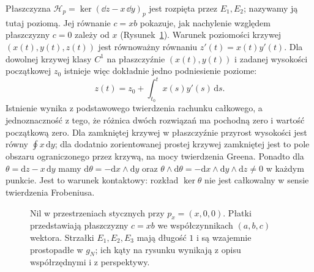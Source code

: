 Płaszczyzna $\mathcal H_p=\ker(\dd z-x\,\dd y)_p$
jest rozpięta przez $E_1,E_2$; nazywamy ją tutaj poziomą.
Jej równanie $c=xb$ pokazuje, jak nachylenie
względem płaszczyzny $c=0$ zależy od $x$
(Rysunek~\ref{fig:metryka-nil-plaszczyzny}).
Warunek poziomości krzywej $(x(t),y(t),z(t))$
jest równoważny równaniu $z'(t)=x(t)y'(t)$.
Dla dowolnej krzywej klasy $C^1$ na płaszczyźnie
$(x(t),y(t))$ i zadanej wysokości początkowej $z_0$
istnieje więc dokładnie jedno podniesienie poziome:
\[
 z(t)=z_0+\int_{t_0}^t x(s)y'(s)\,\mathrm ds .
\]
Istnienie wynika z podstawowego twierdzenia rachunku
całkowego, a jednoznaczność z tego, że różnica dwóch
rozwiązań ma pochodną zero i wartość początkową zero.
Dla zamkniętej krzywej w płaszczyźnie przyrost wysokości
jest równy $\oint x\,\mathrm dy$; dla dodatnio
zorientowanej prostej krzywej zamkniętej jest to pole
obszaru ograniczonego przez krzywą, na mocy twierdzenia Greena.
Ponadto dla $\theta=\mathrm dz-x\,\mathrm dy$ mamy
$\mathrm d\theta=-\mathrm dx\wedge\mathrm dy$ oraz
$\theta\wedge\mathrm d\theta=-\mathrm dx\wedge\mathrm dy
\wedge\mathrm dz\ne0$ w każdym punkcie. Jest to
warunek kontaktowy: rozkład $\ker\theta$ nie jest
całkowalny w sensie twierdzenia Frobeniusa.

\begin{figure}[H]
\centering
{}
\caption{Nil w przestrzeniach stycznych przy $p_x=(x,0,0)$.
Płatki przedstawiają płaszczyzny $c=xb$ we współczynnikach
$(a,b,c)$ wektora. Strzałki $E_1,E_2,E_3$ mają długość $1$
i są wzajemnie prostopadłe w $g_N$; ich kąty na rysunku
wynikają z opisu współrzędnymi i z perspektywy.}
\label{fig:metryka-nil-plaszczyzny}
\end{figure}

